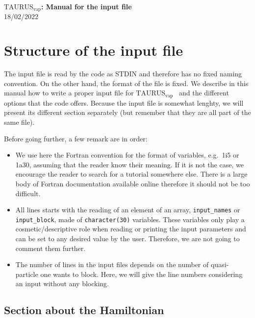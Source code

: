 \documentclass[a4paper,11pt]{article}
\newcommand{\TAURUSvap}{$\text{TAURUS}_{\text{vap}}$}
\newcommand{\ttt}[1]{\texttt{#1}}
\begin{document}
%
% 
\begin{center}
 {\LARGE \textbf{\TAURUSvap: Manual for the input file}} \\
 {\large 18/02/2022}
\end{center}

%
% 
\section{Structure of the input file}

The input file is read by the code as STDIN and therefore has no fixed naming convention. 
On the other hand, the format of the file is fixed. We describe in this manual how to write a proper input file for \TAURUSvap~
and the different options that the code offers.
Because the input file is somewhat lenghty, we will present its different section separately (but remember that they
are all part of the same file).
 
\noindent Before going further, a few remark are in order:
\begin{itemize}
  \item We use here the Fortran convention for the format of variables, e.g.\ 1i5 or 1a30, assuming that the reader
  know their meaning. If it is not the case, we encourage the reader to search for a tutorial somewhere else.
  There is a large body of Fortran documentation available online therefore it should not be too difficult.

  \item All lines starts with the reading of an element of an array, \ttt{input\_names} or \ttt{input\_block},
  made of \ttt{character(30)} variables. 
  These variables only play a cosmetic/descriptive role when reading or printing the input parameters and can be
  set to any desired value by the user. Therefore, we are not going to comment them further.

  \item The number of lines in the input files depends on the number of quasi-particle one wants to block. Here, we will give
  the line numbers considering an input without any blocking.
\end{itemize}

%
%
\subsection{Section about the Hamiltonian}
\end{document}
